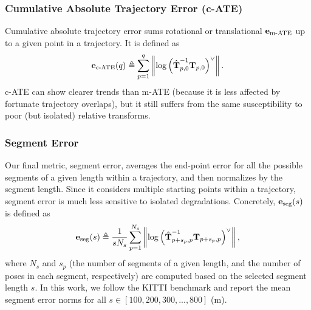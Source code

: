 \subsubsection{Cumulative Absolute Trajectory Error (c-ATE)}
Cumulative absolute trajectory error sums rotational or translational $\boldsymbol{\mathbf{e}}_\text{m-ATE}$ up to a given point in a trajectory. It is defined as
\begin{equation}
	\boldsymbol{\mathbf{e}}_\text{c-ATE} (q)  \triangleq \sum_{p=1}^{q} \left\Vert\mathrm{log}\left({\hat{\boldsymbol{\mathbf{T}}}^{-1}_{p,0} \boldsymbol{\mathbf{T}}_{p,0}}\right)^{\vee}\right\Vert.
\end{equation}
c-ATE can show clearer trends than m-ATE (because it is less affected by fortunate trajectory overlaps), but it still suffers from the same susceptibility to poor (but isolated) relative transforms.

 
\subsubsection{Segment Error} Our final metric, segment error, averages the end-point error for all the possible segments of a given length within a trajectory, and then normalizes by the segment length. Since it considers multiple starting points within a trajectory, segment error is much less sensitive to isolated degradations. Concretely, $\boldsymbol{\mathbf{e}}_\text{seg}(s)$ is defined as
\begin{equation}
	\boldsymbol{\mathbf{e}}_\text{seg}(s)  \triangleq \frac{1}{s N_s} \sum_{p=1}^{N_s} \left\Vert\mathrm{log}\left({\hat{\boldsymbol{\mathbf{T}}}^{-1}_{p+s_p,p} \boldsymbol{\mathbf{T}}_{p+s_p,p}}\right)^{\vee}\right\Vert,
\end{equation}
where $N_s$ and $s_p$ (the number of segments of a given length, and the number of poses in each segment, respectively) are computed based on the selected segment length $s$. In this work, we follow the KITTI benchmark and report the mean segment error norms for all $s \in {[100, 200, 300, ..., 800]}$ (m). 

